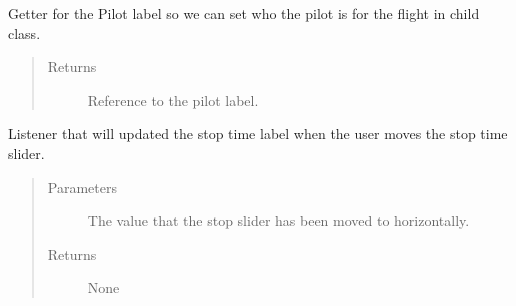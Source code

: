 \documentclass[letterpaper,10pt,english]{sphinxmanual}
\begin{document}
\begin{fulllineitems}
\begin{fulllineitems}
\begin{quote}
\begin{description}
\end{description}\end{quote}

\end{fulllineitems}


\begin{fulllineitems}
\label{\detokenize{index:src.Views.View_ReportScreen.ReportWindow.del_LblPilot}}
Getter for the Pilot label so we can set who the pilot is for the flight in child class.
\begin{quote}\begin{description}
\item[{Returns}] \leavevmode
Reference to the pilot label.

\end{description}\end{quote}

\end{fulllineitems}


\begin{fulllineitems}
\label{\detokenize{index:src.Views.View_ReportScreen.ReportWindow.handleEndSliderValueChange}}
Listener that will updated the stop time label when the user moves the stop
time slider.
\begin{quote}\begin{description}
\item[{Parameters}] \leavevmode
{} \textendash{} The value that the stop slider has been moved to horizontally.

\item[{Returns}] \leavevmode
None

\end{description}\end{quote}

\end{fulllineitems}


\end{fulllineitems}
\end{document}

